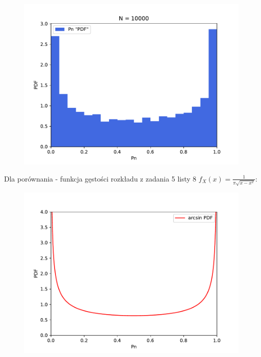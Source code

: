 \documentclass{article}
\begin{document}
\begin{figure}[h!]
\begin{minipage}{0.45\textwidth}
    \end{minipage}
    \begin{minipage}{0.45\textwidth}
        \centering
        \includegraphics[scale=0.5]{./plots/exc3/n10000.pdf}
    \end{minipage}
\end{figure}

Dla porównania - funkcja gęstości rozkładu z zadania 5 listy 8 \( f_X\left(x\right) = \frac{1}{\pi\sqrt{x - x^2}} \):\\
\begin{figure}[h!]
    \centering
    \includegraphics[scale=0.8]{./plots/exc3/arcsin.pdf}
\end{figure}
\end{document}
